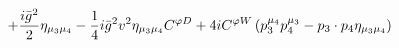 %
\begin{dmath*}
%
  +  \frac{i {\bar g}{}^2}{2}\eta_{\mu_3 \mu_4}  -  \frac{1}{4} i {\bar g}{}^2 v^2\eta_{\mu_3 \mu_4} C^{ \varphi  D}  +  4 iC^{ \varphi  W} \left(p_3^{\mu_4} p_4^{\mu_3} - p_{3}\nobreak\cdot\nobreak{}p_{4} \eta_{\mu_3 \mu_4}\right)
%
\end{dmath*}
%
